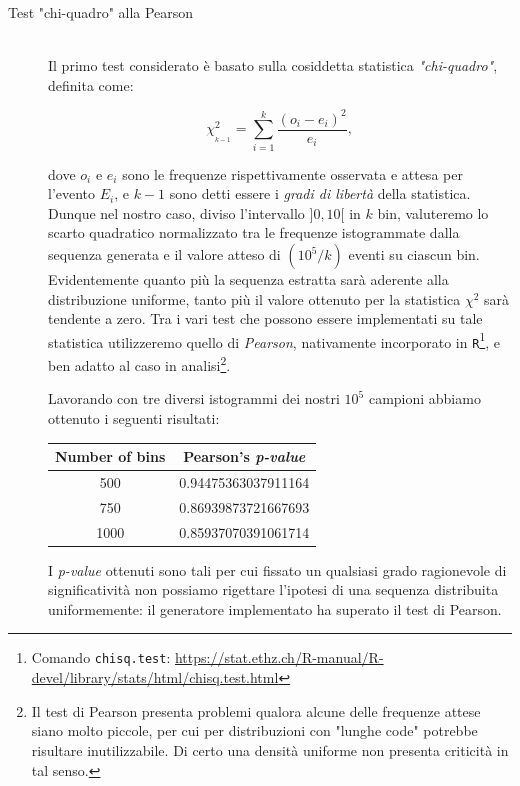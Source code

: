 \begin{description}\label{PearsonTest}
	\item[\quad\quad\! Test "chi-quadro" alla Pearson]\quad\\
	\noindent Il primo test considerato è basato sulla cosiddetta statistica \emph{"chi-quadro"}, definita come:
	
	\begin{equation*}
	\chi_{_{k-1}}^2 = \sum_{i=1}^{k} \frac{(o_i - e_i)^2}{e_i},
	\end{equation*}
	
	\noindent dove $o_i$ e $e_i$ sono le frequenze rispettivamente osservata e attesa per l'evento $E_i$, e $k-1$ sono detti essere i \emph{gradi di libertà} della statistica. Dunque nel nostro caso, diviso l'intervallo $]0,10[$ in $k$ bin, valuteremo lo scarto quadratico normalizzato tra le frequenze istogrammate dalla sequenza generata e il valore atteso di $(10^5 / k)$ eventi su ciascun bin. Evidentemente quanto più la sequenza estratta sarà aderente alla distribuzione uniforme, tanto più il valore ottenuto per la statistica $\chi^2$ sarà tendente a zero. Tra i vari test che possono essere implementati su tale statistica utilizzeremo quello di \emph{Pearson}, nativamente incorporato in \texttt{R}\footnote{Comando \texttt{chisq.test}: \url{https://stat.ethz.ch/R-manual/R-devel/library/stats/html/chisq.test.html}}, e ben adatto al caso in analisi\footnote{Il test di Pearson presenta problemi qualora alcune delle frequenze attese siano molto piccole, per cui per distribuzioni con "lunghe code" potrebbe risultare inutilizzabile. Di certo una densità uniforme non presenta criticità in tal senso.}.\smallskip

	\noindent Lavorando con tre diversi istogrammi dei nostri $10^5$ campioni abbiamo ottenuto i seguenti risultati:
	
	\bgroup
	\def\arraystretch{1.5}
	\begin{center}
		\begin{tabular}{c|c}
			Number of bins & Pearson's \emph{p-value}\\ \hline\hline
			500 & 0.94475363037911164\\
			750 & 0.86939873721667693\\
			1000 & 0.85937070391061714\\
		\end{tabular}
	\end{center}
	\egroup
	
	\noindent I \emph{p-value} ottenuti sono tali per cui fissato un qualsiasi grado ragionevole di significatività non possiamo rigettare l'ipotesi di una sequenza distribuita uniformemente: il generatore implementato ha superato il test di Pearson.
	

\end{description}
